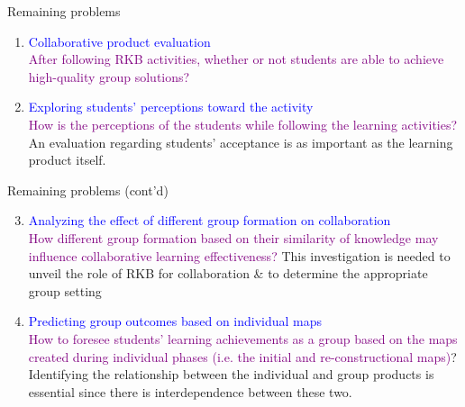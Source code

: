 \begin{frame}{Remaining problems}
    \begin{enumerate}
        \item <1>\textcolor{blue}{Collaborative product evaluation\\} 
        {\small \textcolor{purple}{After following RKB activities, 
        whether or not students are able to achieve high-quality group solutions?}}
        
        \item <2>\textcolor{blue}{Exploring students' perceptions toward the activity\\} 
        {\small \textcolor{purple}{How is the perceptions of the students while following the learning activities?} An evaluation regarding students' acceptance is as important as the learning product itself.}
        \end{enumerate}
  \end{frame}    
\begin{frame}{Remaining problems (cont'd)}
    \begin{enumerate}\setcounter{enumi}{2}
        \item <1> \textcolor{blue}{Analyzing the effect of different group formation on collaboration\\}
        {\small \textcolor{purple}{How different group formation based on their similarity of knowledge may influence collaborative learning effectiveness?} This investigation is needed to unveil the role of RKB for collaboration \& to determine the appropriate group setting} 
        \item <2> \textcolor{blue}{Predicting group outcomes based on individual maps\\}
        {\small \textcolor{purple}{How to foresee students' learning achievements as a group based on the maps created during individual phases (i.e. the initial and re-constructional maps)}? Identifying the relationship between the individual and group products is essential since there is interdependence between these two.} 
    \end{enumerate}
\end{frame}



